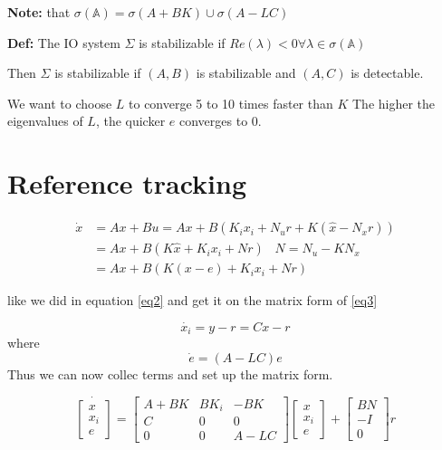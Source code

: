 \documentclass[a4paper]{article}
\begin{document}
\textbf{Note:} that $ \sigma(\mathbb{A}) = \sigma(A+BK) \cup \sigma(A- L C)$ 

\begin{framed}
	\textbf{Def:} The IO system $ \Sigma $ is stabilizable if  $ Re(\lambda) < 0 \forall \lambda \in \sigma(\mathbb{A})$  
\end{framed} 

Then $ \Sigma $ is stabilizable if  $ (A,B) $ is stabilizable and  $ (A,C) $ is detectable.

We want to choose $ L $ to converge 5 to 10 times faster than  $ K $
The higher the eigenvalues of $ L $, the quicker $ e $ converges to 0.

\section{Reference tracking}
\begin{align}
\dot{x} &= Ax + Bu = Ax + B(K_i x_i + N_u r + K(\hat{x} - N_x r)) \\
		&= Ax + B(K \hat{x} + K_i x_i + Nr) \hspace{10pt} N = N_u - K N_x\\
		&= Ax + B(K(x-e) + K_i x_i + N r) 
\end{align}


like we did in equation \ref{eq2} and get it on the matrix form of \ref{eq3}

\begin{equation}
\dot{x_i} = y - r = C x - r
\end{equation}
where 
\begin{equation}
\dot{e} = (A - L C) e
\end{equation}
Thus we can now collec terms and set up the matrix form.

\begin{equation}
\dot{\begin{bmatrix}
x \\
x_i \\
e
\end{bmatrix} } = \begin{bmatrix}
A+BK & B K_i & -BK\\
C & 0 & 0\\
0 & 0 & A-L C
\end{bmatrix} \begin{bmatrix}
x \\
x_i \\
e
\end{bmatrix} + \begin{bmatrix}
B N \\
- I \\
0
\end{bmatrix} r
\end{equation}
\end{document}

